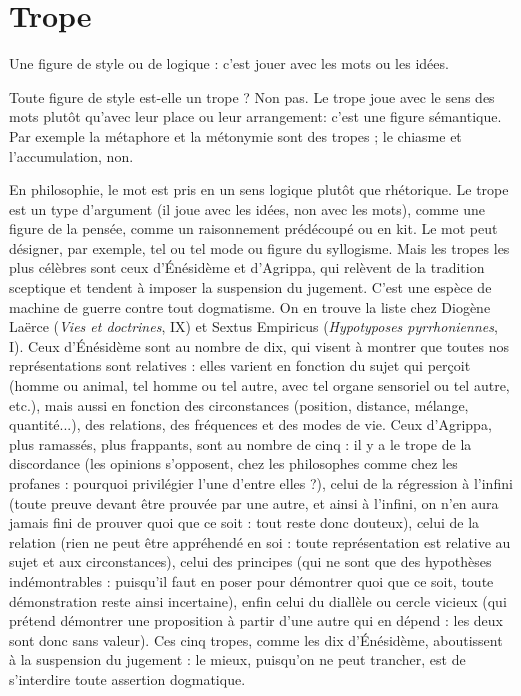 \section{Trope}
Une figure de style ou de logique : c’est jouer avec les mots ou les
idées.

Toute figure de style est-elle un trope ? Non pas. Le trope joue avec le sens
des mots plutôt qu'avec leur place ou leur arrangement: c’est une figure
sémantique. Par exemple la métaphore et la métonymie sont des tropes ; le
chiasme et l’accumulation, non.

En philosophie, le mot est pris en un sens logique plutôt que rhétorique. Le
trope est un type d’argument (il joue avec les idées, non avec les mots), comme
une figure de la pensée, comme un raisonnement prédécoupé ou en kit. Le mot
peut désigner, par exemple, tel ou tel mode ou figure du syllogisme. Mais les
tropes les plus célèbres sont ceux d’Énésidème et d’Agrippa, qui relèvent de la
tradition sceptique et tendent à imposer la suspension du jugement. C’est une
espèce de machine de guerre contre tout dogmatisme. On en trouve la liste
chez Diogène Laërce ({\it Vies et doctrines}, IX) et Sextus Empiricus ({\it Hypotyposes
pyrrhoniennes}, I). Ceux d’Énésidème sont au nombre de dix, qui visent à montrer
que toutes nos représentations sont relatives : elles varient en fonction du
sujet qui perçoit (homme ou animal, tel homme ou tel autre, avec tel organe
sensoriel ou tel autre, etc.), mais aussi en fonction des circonstances (position,
distance, mélange, quantité...), des relations, des fréquences et des modes de
vie. Ceux d’Agrippa, plus ramassés, plus frappants, sont au nombre de cinq : il
y a le trope de la discordance (les opinions s'opposent, chez les philosophes
comme chez les profanes : pourquoi privilégier l’une d’entre elles ?), celui de la
régression à l'infini (toute preuve devant être prouvée par une autre, et ainsi à
l'infini, on n’en aura jamais fini de prouver quoi que ce soit : tout reste donc
douteux), celui de la relation (rien ne peut être appréhendé en soi : toute représentation
est relative au sujet et aux circonstances), celui des principes (qui ne
sont que des hypothèses indémontrables : puisqu'il faut en poser pour démontrer
quoi que ce soit, toute démonstration reste ainsi incertaine), enfin celui du
diallèle ou cercle vicieux (qui prétend démontrer une proposition à partir d’une
autre qui en dépend : les deux sont donc sans valeur). Ces cinq tropes, comme
les dix d’Énésidème, aboutissent à la suspension du jugement : le mieux,
puisqu'on ne peut trancher, est de s’interdire toute assertion dogmatique.

